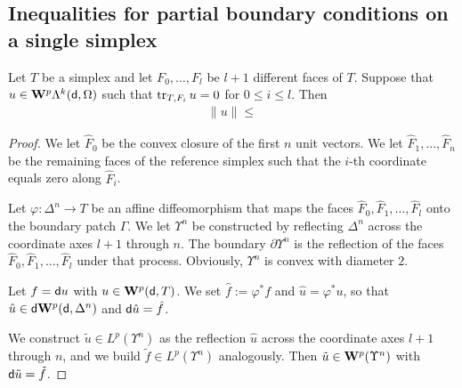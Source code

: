 \documentclass[a4paper]{article}
\begin{document}
\subsection{Inequalities for partial boundary conditions on a single simplex}


\begin{lemma}
    Let $T$ be a simplex and let $F_{0},\dots,F_{l}$ be $l+1$ different faces of $T$. 
    Suppose that $u \in {\mathbf W}^{p}\Lambda^{k}({\mathsf d},\Omega)$ such that 
    $\operatorname{tr}_{T,F_i} u = 0$ for $0 \leq i \leq l$.
    Then 
    \begin{align*}
        \| u \| \leq 
    \end{align*}
\end{lemma}
\begin{proof}
    We let $\hat F_0$ be the convex closure of the first $n$ unit vectors. 
    We let $\hat F_1, \dots, \hat F_n$ be the remaining faces of the reference simplex 
    such that the $i$-th coordinate equals zero along $\hat F_i$.

    Let $\varphi : \Delta^{n} \rightarrow T$ be an affine diffeomorphism 
    that maps the faces $\hat F_{0}, \hat F_{1}, \dots, \hat F_{l}$ onto the boundary patch $\Gamma$. 
    We let $\Upsilon^{n}$ be constructed by reflecting $\Delta^{n}$ across the coordinate axes $l+1$ through $n$.
    The boundary $\partial\Upsilon^{n}$ is the reflection of the faces $\hat F_{0}, \hat F_{1}, \dots, \hat F_{l}$ under that process. 
    Obviously, $\Upsilon^{n}$ is convex with diameter $2$. 


    Let $f = {\mathsf d} u$ with $u \in {\mathbf W}^{p}({\mathsf d},T)$.
    We set $\hat f := \varphi^{\ast} f$ and $\hat u = \varphi^{\ast} u$, 
    so that $\hat u \in {\mathsf d} {\mathbf W}^{p}({\mathsf d},\Delta^{n})$ and ${\mathsf d} \hat u = \hat f$.

    We construct $\tilde u \in L^{p}(\Upsilon^{n})$ as the reflection $\hat u$ across the coordinate axes $l+1$ through $n$, and we build $\tilde f \in L^{p}(\Upsilon^{n})$ analogously.
    Then $\tilde u \in {\mathbf W}^{p}(\Upsilon^{n})$ with ${\mathsf d} \tilde u = \tilde f$. 


\end{proof}
\end{document}
